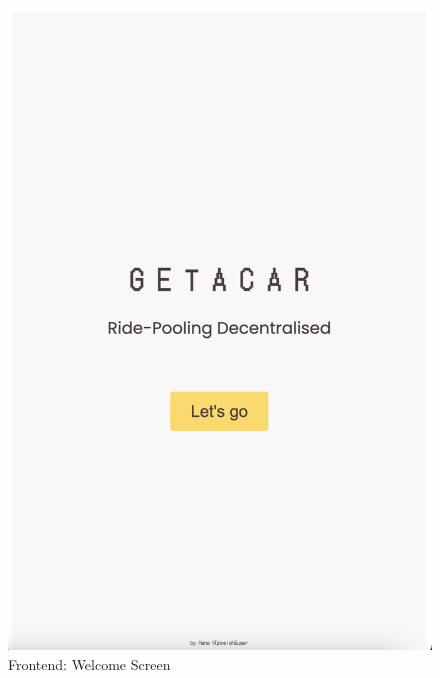 \begin{figure}[H]
    \centering
    
    \begin{minipage}{0.45\linewidth}
        \centering
        \includegraphics[width=\linewidth]{data/ffss/1.png}
        \caption{Frontend: Welcome Screen}
        \label{fig:WelcomeScreen}
    \end{minipage}
    \hfill
    \begin{minipage}{0.45\linewidth}
        \centering

\end{minipage}
\end{figure}
